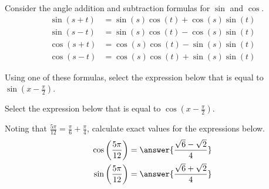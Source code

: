 \documentclass{ximera}
\author{Nela Lakos \and Kyle Parsons}
\begin{document}
\begin{exercise}

Consider the angle addition and subtraction formulas for $\sin$ and $\cos$.
\begin{align*}
\sin(s+t) &= \sin(s)\cos(t) + \cos(s)\sin(t)\\
\sin(s-t) &= \sin(s)\cos(t) - \cos(s)\sin(t)\\
\cos(s+t) &= \cos(s)\cos(t) - \sin(s)\sin(t)\\
\cos(s-t) &= \cos(s)\cos(t) + \sin(s)\sin(t)
\end{align*}

Using one of these formulas, select the expression below that is equal to $\sin\left(x-\frac{\pi}{2}\right)$.

\begin{multipleChoice}
\end{multipleChoice}

Select the expression below that is equal to $\cos\left(x-\frac{\pi}{2}\right)$.

\begin{multipleChoice}
\end{multipleChoice}

Noting that $\frac{5\pi}{12} = \frac{\pi}{6} + \frac{\pi}{4}$, calculate exact values for the expressions below.
\begin{align*}
\cos\left(\frac{5\pi}{12}\right) &= \answer{\frac{\sqrt{6}-\sqrt{2}}{4}}\\
\sin\left(\frac{5\pi}{12}\right) &= \answer{\frac{\sqrt{6}+\sqrt{2}}{4}}
\end{align*}

\end{exercise}
\end{document}
